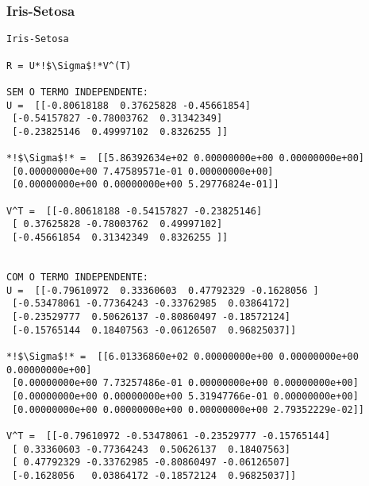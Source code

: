 \documentclass[a4paper,12pt,twoside]{article}
\begin{document}
\subsubsection{Iris-Setosa}
\begin{lstlisting}
Iris-Setosa

R = U*!$\Sigma$!*V^(T)

SEM O TERMO INDEPENDENTE: 
U =  [[-0.80618188  0.37625828 -0.45661854]
 [-0.54157827 -0.78003762  0.31342349]
 [-0.23825146  0.49997102  0.8326255 ]]

*!$\Sigma$!* =  [[5.86392634e+02 0.00000000e+00 0.00000000e+00]
 [0.00000000e+00 7.47589571e-01 0.00000000e+00]
 [0.00000000e+00 0.00000000e+00 5.29776824e-01]]

V^T =  [[-0.80618188 -0.54157827 -0.23825146]
 [ 0.37625828 -0.78003762  0.49997102]
 [-0.45661854  0.31342349  0.8326255 ]]


COM O TERMO INDEPENDENTE: 
U =  [[-0.79610972  0.33360603  0.47792329 -0.1628056 ]
 [-0.53478061 -0.77364243 -0.33762985  0.03864172]
 [-0.23529777  0.50626137 -0.80860497 -0.18572124]
 [-0.15765144  0.18407563 -0.06126507  0.96825037]]

*!$\Sigma$!* =  [[6.01336860e+02 0.00000000e+00 0.00000000e+00 0.00000000e+00]
 [0.00000000e+00 7.73257486e-01 0.00000000e+00 0.00000000e+00]
 [0.00000000e+00 0.00000000e+00 5.31947766e-01 0.00000000e+00]
 [0.00000000e+00 0.00000000e+00 0.00000000e+00 2.79352229e-02]]

V^T =  [[-0.79610972 -0.53478061 -0.23529777 -0.15765144]
 [ 0.33360603 -0.77364243  0.50626137  0.18407563]
 [ 0.47792329 -0.33762985 -0.80860497 -0.06126507]
 [-0.1628056   0.03864172 -0.18572124  0.96825037]]
\end{lstlisting}
\end{document}
